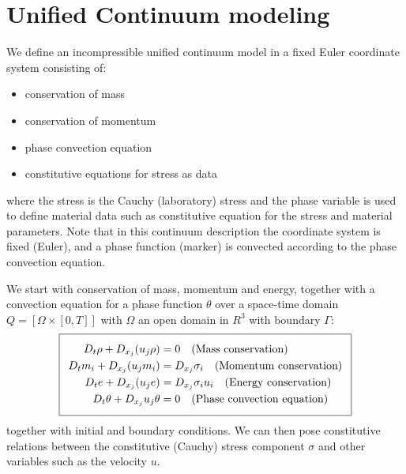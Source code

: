 

\section{Unified Continuum modeling}


We define an incompressible unified continuum model in a fixed Euler
coordinate system consisting of:
\begin{itemize}
\item
conservation of mass
\item
conservation of momentum
\item
phase convection equation
\item
constitutive equations for stress as data
\end{itemize}
where the stress is the Cauchy (laboratory) stress and the phase
variable is used to define material data such as constitutive equation
for the stress and material parameters. Note that in this continuum
description the coordinate system is fixed (Euler), and a phase
function (marker) is convected according to the phase convection
equation.

We start with conservation of mass, momentum and energy, together with
a convection equation for a phase function $\theta$ over a space-time
domain $Q = [\Omega \times [0, T]]$ with $\Omega$ an open domain in
$R^3$ with boundary $\Gamma$:
\begin{equation}
  \addtolength{\fboxsep}{5pt}
  \boxed{
    \begin{split}\label{eq:TotalModel}
      D_t \rho + D_{x_j} (u_j \rho) &= 0
      \quad \text{(Mass conservation)}\\
      D_t m_i + D_{x_j} (u_j m_i) &= D_{x_j} \sigma_i
      \quad \text{(Momentum conservation)}\\
      D_t e + D_{x_j} (u_j e) &= D_{x_j} \sigma_i u_i
      \quad \text{(Energy conservation)}\\
      D_t \theta + D_{x_j} u_j \theta &= 0
      \quad \text{(Phase convection equation)}
    \end{split}
  }
\end{equation}
together with initial and boundary conditions. We can then pose
constitutive relations between the constitutive (Cauchy) stress
component $\sigma$ and other variables such as the velocity $u$.

